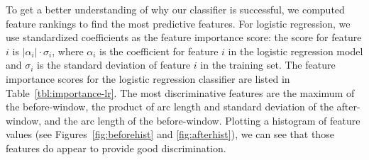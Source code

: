 


To get a better understanding of why our classifier is successful,
we computed feature rankings to find the most predictive features.
For logistic regression, we use standardized coefficients as the feature importance score:
the score for feature $i$ is $|\alpha_i| \cdot \sigma_i$, where $\alpha_i$ is the coefficient for feature $i$ in the logistic regression model and $\sigma_i$ is the standard deviation of feature $i$ in the training set.
The feature importance scores for the logistic regression classifier are listed in Table~\ref{tbl:importance-lr}.
The most discriminative features are
the maximum of the before-window,
the product of arc length and standard deviation of the after-window,
and the arc length of the before-window.
Plotting a histogram of feature values (see Figures~\ref{fig:beforehist} and \ref{fig:afterhist}), we can see that those features do appear to provide good discrimination.


